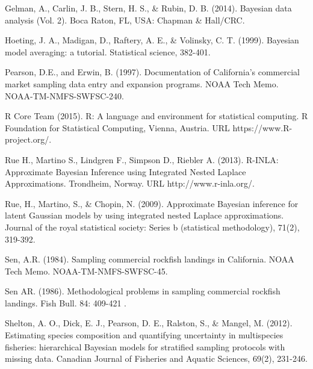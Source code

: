 \begin{thebibliography}{1}

%
 Gelman, A., Carlin, J. B., Stern, H. S., \& Rubin, D. B. (2014). Bayesian data analysis (Vol. 2). Boca Raton, FL, USA: Chapman \& Hall/CRC.

%
 Hoeting, J. A., Madigan, D., Raftery, A. E., \& Volinsky, C. T. (1999). Bayesian model averaging: a tutorial. Statistical science, 382-401.

%
 Pearson, D.E., and Erwin, B. (1997). Documentation of California’s commercial market sampling data entry and expansion programs. NOAA Tech Memo. NOAA-TM-NMFS-SWFSC-240.

%
 R Core Team (2015). R: A language and environment for statistical computing. R Foundation for Statistical Computing, Vienna, Austria. URL https://www.R-project.org/.

%
 Rue H., Martino S., Lindgren F., Simpson D., Riebler A. (2013). R-INLA:
Approximate Bayesian Inference using Integrated Nested Laplace
Approximations. Trondheim, Norway. URL http://www.r-inla.org/.

%
 Rue, H., Martino, S., \& Chopin, N. (2009). Approximate Bayesian
inference for latent Gaussian models by using integrated nested Laplace
approximations. Journal of the royal statistical society: Series b
(statistical methodology), 71(2), 319-392.

%
 Sen, A.R. (1984). Sampling commercial rockfish landings in California. NOAA Tech Memo. NOAA-TM-NMFS-SWFSC-45.

%
 Sen AR. (1986). Methodological problems in sampling commercial rockfish landings. Fish Bull. 84: 409-421 .

%
 Shelton, A. O., Dick, E. J., Pearson, D. E., Ralston, S., \& Mangel, M. (2012). Estimating species composition and quantifying uncertainty in multispecies fisheries: hierarchical 
Bayesian models for stratified sampling protocols with missing data. Canadian Journal of Fisheries and Aquatic Sciences, 69(2), 231-246.

\end{thebibliography}
